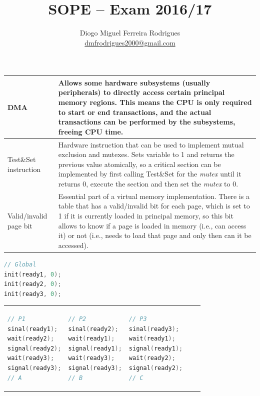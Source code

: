 \documentclass{sope}
\title{SOPE -- Exam 2016/17}
\author{Diogo Miguel Ferreira Rodrigues \\ \href{mailto:dmfrodrigues2000@gmail.com}{dmfrodrigues2000@gmail.com}}
\begin{document}
\setcounter{chapter}{16}
{
\renewcommand{\thesubsection}{\thesection\alph{subsection}}
\begin{tabular}{p{29mm} | p{122mm}}
    DMA & Allows some hardware subsystems (usually peripherals) to directly access certain principal memory regions. This means the CPU is only required to start or end transactions, and the actual transactions can be performed by the subsystems, freeing CPU time. \\ \hline
    Test\&Set instruction & Hardware instruction that can be used to implement mutual exclusion and mutexes. Sets variable to 1 and returns the previous value atomically, so a critical section can be implemented by first calling Test\&Set for the \emph{mutex} until it returns 0, execute the section and then set the \emph{mutex} to 0. \\ \hline
    Valid/invalid page bit & Essential part of a virtual memory implementation. There is a table that has a valid/invalid bit for each page, which is set to 1 if it is currently loaded in principal memory, so this bit allows to know if a page is loaded in memory (i.e., can access it) or not (i.e., needs to load that page and only then can it be accessed).
\end{tabular}

\begin{lstlisting}[language=C]
// Global
init(ready1, 0);
init(ready2, 0);
init(ready3, 0);
\end{lstlisting}
\begin{tabular}{p{49mm} p{49mm} p{49mm}}
    \begin{lstlisting}[language=C]
// P1
sinal(ready1);
wait(ready2);
signal(ready2);
wait(ready3);
signal(ready3);
// A    
    \end{lstlisting} &
    \begin{lstlisting}[language=C]
// P2
sinal(ready2);
wait(ready1);
signal(ready1);
wait(ready3);
signal(ready3);
// B    
    \end{lstlisting} &
    \begin{lstlisting}[language=C]
// P3
sinal(ready3);
wait(ready1);
signal(ready1);
wait(ready2);
signal(ready2);    
// C
    \end{lstlisting}
\end{tabular}

}
\end{document}
